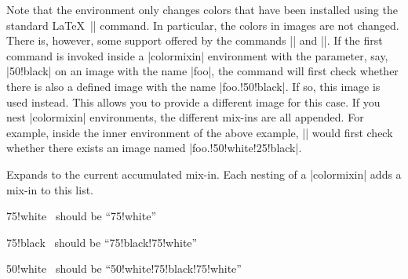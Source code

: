 Note that the environment only changes colors that have been installed
using the standard \LaTeX\ |\color| command. In particular,
the colors in images are not changed. There is, however, some support
offered by the commands |\pgfuseimage| and
|\pgfuseshading|. If the first command is invoked 
inside a |colormixin| environment with the parameter, say,
|50!black| on an image with the name |foo|, the command
will first check whether there is also a defined image with the name
|foo.!50!black|. If so, this image is used instead. This allows
you to provide a different image for this case. If you nest
|colormixin| environments, the different mix-ins are all appended. For
example, inside the inner environment of 
the above example, || would first check whether
there exists an image named |foo.!50!white!25!black|.

\begin{command}{}
  Expands to the current accumulated mix-in. Each nesting of a
  |colormixin| adds a mix-in to this list.
\begin{codeexample}[]
\begin{minipage}{\linewidth-6pt}\raggedright
\begin{colormixin}{75!white}
  \ should be ``75!white''\par
  \begin{colormixin}{75!black}
    \ should be ``75!black!75!white''\par
    \begin{colormixin}{50!white}
      \ should be ``50!white!75!black!75!white''\par
    \end{colormixin}
  \end{colormixin}
\end{colormixin}
\end{minipage}
\end{codeexample}
\end{command}





